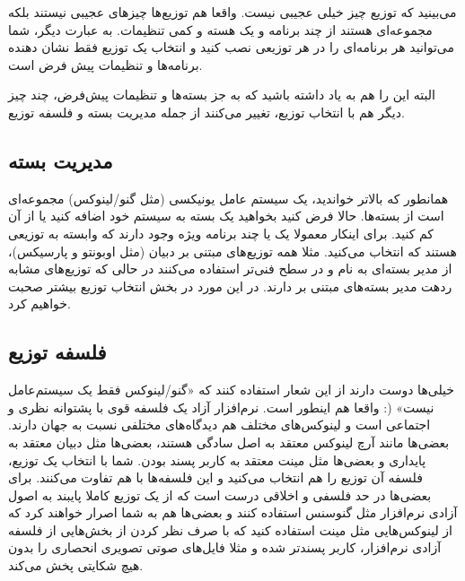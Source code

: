 می‌بینید که توزیع چیز خیلی عجیبی نیست. واقعا هم توزیع‌ها چیزهای عجیبی نیستند بلکه مجموعه‌ای هستند از چند برنامه و یک هسته و کمی تنظیمات. به عبارت دیگر، شما می‌توانید هر برنامه‌ای را در هر توزیعی نصب کنید و انتخاب یک توزیع فقط نشان دهنده برنامه‌ها و تنظیمات پیش فرض است.
	
البته این را هم به یاد داشته باشید که به جز بسته‌ها و تنظیمات پیش‌فرض، چند چیز دیگر هم با انتخاب توزیع، تغییر می‌کنند از جمله مدیریت بسته و فلسفه توزیع.
\subsection*{مدیریت بسته}

همانطور که بالاتر خواندید، یک سیستم عامل یونیکسی (مثل گنو/لینوکس) مجموعه‌ای است از بسته‌ها. حالا فرض کنید بخواهید یک بسته به سیستم خود اضافه کنید یا از آن کم کنید. برای اینکار معمولا یک یا چند برنامه ویژه وجود دارند که وابسته به توزیعی هستند که انتخاب می‌کنید. مثلا همه توزیع‌های مبتنی بر دبیان (مثل اوبونتو و پارسیکس)، از مدیر بسته‌ای به نام 
 و در سطح فنی‌تر 
 استفاده می‌کنند در حالی که توزیع‌های مشابه ردهت مدیر بسته‌های مبتنی بر 
 دارند. در این مورد در بخش انتخاب توزیع بیشتر صحبت خواهیم کرد.
\subsection*{فلسفه توزیع}
خیلی‌ها دوست دارند از این شعار استفاده کنند که «گنو/لینوکس فقط یک سیستم‌عامل نیست» (: واقعا هم اینطور است. نرم‌افزار آزاد یک فلسفه قوی با پشتوانه نظری و اجتماعی است و لینوکس‌های مختلف هم دیدگاه‌های مختلفی نسبت به جهان دارند. بعضی‌ها مانند آرچ لینوکس معتقد به اصل سادگی هستند،‌ بعضی‌ها مثل دبیان معتقد به پایداری و بعضی‌ها مثل مینت معتقد به کاربر پسند بودن. شما با انتخاب یک توزیع، فلسفه آن توزیع را هم انتخاب می‌کنید و این فلسفه‌ها با هم تفاوت می‌کنند.
برای بعضی‌ها در حد فلسفی و اخلاقی درست است که از یک توزیع کاملا پایبند به اصول آزادی نرم‌افزار مثل گنوسنس استفاده کنند و بعضی‌ها هم به شما اصرار خواهند کرد که از لینوکس‌هایی مثل مینت استفاده کنید که با صرف نظر کردن از بخش‌هایی از فلسفه آزادی نرم‌افزار، کاربر پسندتر شده و مثلا فایل‌های صوتی تصویری انحصاری را بدون هیچ شکایتی پخش می‌کند.
